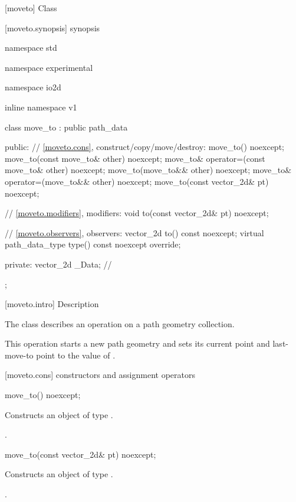  [moveto] {Class }

 [moveto.synopsis] { synopsis}

\begin{codeblock}
namespace std { namespace experimental { namespace io2d { inline namespace v1 {
  class move_to : public path_data {
  public:
    // \ref{moveto.cons}, construct/copy/move/destroy:
    move_to() noexcept;
    move_to(const move_to& other) noexcept;
    move_to& operator=(const move_to& other) noexcept;
    move_to(move_to&& other) noexcept;
    move_to& operator=(move_to&& other) noexcept;
    move_to(const vector_2d& pt) noexcept;

    // \ref{moveto.modifiers}, modifiers:
    void to(const vector_2d& pt) noexcept;

    // \ref{moveto.observers}, observers:
    vector_2d to() const noexcept;
    virtual path_data_type type() const noexcept override;
    
  private:
    vector_2d _Data; // \expos
  };
} } } }
\end{codeblock}

 [moveto.intro] { Description}

\pnum
{}
The class  describes an operation on a path geometry collection.

\pnum
This operation starts a new path geometry and sets its current point and last-move-to point to the value of .

 [moveto.cons] { constructors and assignment operators}

\begin{itemdecl}
    move_to() noexcept;
\end{itemdecl}
\begin{itemdescr}
	\pnum
	\effects
	Constructs an object of type .
	
	\pnum
	\postconditions
	.
\end{itemdescr}

\begin{itemdecl}
    move_to(const vector_2d& pt) noexcept;
\end{itemdecl}
\begin{itemdescr}
	\pnum
	\effects
	Constructs an object of type .
	
	\pnum
	\postconditions
	.
\end{itemdescr}

